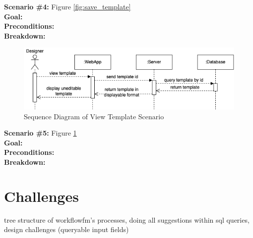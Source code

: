\noindent
\textbf{Scenario \#4:} Figure \ref{fig:save_template} \\
\textbf{Goal:} \\
\textbf{Preconditions:} \\
\textbf{Breakdown:} \\

\begin{figure}[ht!]
    \centering
    \includegraphics[width=\textwidth]{overleaf/images/view_template.png}
    \caption{Sequence Diagram of View Template Scenario}
    \label{fig:view_template}
\end{figure}

\noindent
\textbf{Scenario \#5:} Figure \ref{fig:view_template} \\
\textbf{Goal:} \\
\textbf{Preconditions:} \\
\textbf{Breakdown:} \\

\section{Challenges}

tree structure of workflowfm's processes, doing all suggestions within sql queries, design challenges (queryable input fields)
